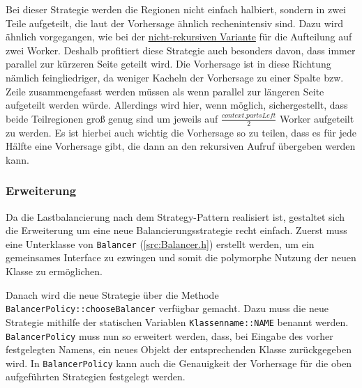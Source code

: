 Bei dieser Strategie werden die Regionen nicht einfach halbiert, sondern in zwei Teile aufgeteilt, die laut der Vorhersage ähnlich rechenintensiv sind.
Dazu wird ähnlich vorgegangen, wie bei der \hyperref[lastbalancierung_vorhersage]{nicht-rekursiven Variante} für die Aufteilung auf zwei Worker.
Deshalb profitiert diese Strategie auch besonders davon, dass immer parallel zur kürzeren Seite geteilt wird.
Die Vorhersage ist in diese Richtung nämlich feingliedriger, da weniger Kacheln der Vorhersage zu einer Spalte bzw. Zeile zusammengefasst werden müssen als wenn parallel zur längeren Seite aufgeteilt werden würde.
Allerdings wird hier, wenn möglich, sichergestellt, dass beide Teilregionen groß genug sind um jeweils auf $\frac{context.partsLeft}{2}$ Worker aufgeteilt zu werden.
Es ist hierbei auch wichtig die Vorhersage so zu teilen, dass es für jede Hälfte eine Vorhersage gibt, die dann an den rekursiven Aufruf übergeben werden kann.

\subsubsection{Erweiterung}\label{lastbalancierung_erweiterung}

Da die Lastbalancierung nach dem Strategy-Pattern realisiert ist, gestaltet sich die Erweiterung um eine neue Balancierungsstrategie recht einfach.
Zuerst muss eine Unterklasse von \verb|Balancer| (\autoref{src:Balancer.h}) erstellt werden, um ein gemeinsames Interface zu ezwingen und somit die polymorphe Nutzung der neuen Klasse zu ermöglichen.

\begin{figure}
	
\end{figure}

Danach wird die neue Strategie über die Methode \verb|BalancerPolicy::chooseBalancer| verfügbar gemacht.
Dazu muss die neue Strategie mithilfe der statischen Variablen \verb|Klassenname::NAME| benannt werden.
\verb|BalancerPolicy| muss nun so erweitert werden, dass, bei Eingabe des vorher festgelegten Namens, ein neues Objekt der entsprechenden Klasse zurückgegeben wird.
In \verb|BalancerPolicy| kann auch die Genauigkeit der Vorhersage für die oben aufgeführten Strategien festgelegt werden.

